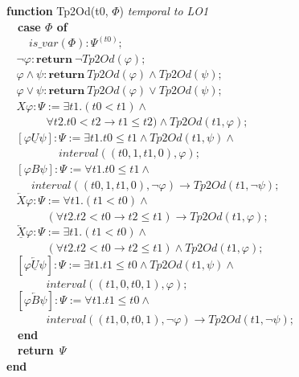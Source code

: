 \documentclass{article}
\begin{document}
\begin{multicols}{4}
\textbf{function} Tp2Od(t0, $\Phi$) \/\/\textit{temporal to LO1} \\
\ \ \textbf{case $\Phi$ of} \\
\ \ \ \ $is\_var(\Phi): \Psi^{(t0)};$ \\
$\ \ \ \ \neg \varphi : \textbf{return}\ \neg Tp2Od(\varphi); $ \\
$\ \ \ \ \varphi \wedge \psi : \textbf{return}\ Tp2Od(\varphi) \wedge Tp2Od(\psi); $ \\
$\ \ \ \ \varphi \vee \psi : \textbf{return}\ Tp2Od(\varphi) \vee Tp2Od(\psi); $ \\
$\ \ \ \ X\varphi : \Psi := \exists t1.(t0 < t1)\wedge$\\
$\ \ \ \ \ \ \ \ \ \ \ \ \ \ \ \ \forall t2.t0 < t2 \rightarrow t1 \leq t2) \wedge Tp2Od(t1, \varphi);$ \\
$\ \ \ \ [\varphi \underline{U} \psi] : \Psi := \exists t1.t0 \leq t1 \wedge Tp2Od(t1, \psi)\wedge$ \\
$\ \ \ \ \ \ \ \ \ \ \ \ \ \ \ \ \ \ \ \ \ interval((t0, 1, t1, 0), \varphi);$\\
$\ \ \ \ [\varphi B \psi] : \Psi := \forall t1.t0 \leq t1 \wedge $ \\
$\ \ \ \ \ \ \ \ \ \ interval((t0, 1, t1, 0), \neg\varphi) \rightarrow Tp2Od(t1, \neg\psi);$\\
$\ \ \ \ \overleftarrow{X}\varphi : \Psi := \forall t1.(t1 < t0)\wedge$ \\
$\ \ \ \ \ \ \ \ \ \ \ \ \ \ \ \ (\forall t2.t2 < t0 \rightarrow t2 \leq t1) \rightarrow Tp2Od(t1, \varphi);$ \\
$\ \ \ \ \overleftarrow{\underline{X}}\varphi : \Psi := \exists t1.(t1 < t0)\wedge$ \\
$\ \ \ \ \ \ \ \ \ \ \ \ \ \ \ \ (\forall t2.t2 < t0 \rightarrow t2 \leq t1) \wedge Tp2Od(t1, \varphi);$ \\
$\ \ \ \ [\varphi \overleftarrow{\underline{U}} \psi] : \Psi := \exists t1.t1 \leq t0 \wedge Tp2Od(t1, \psi)\wedge$ \\
$\ \ \ \ \ \ \ \ \ \ \ \ \ \ \ \ interval((t1, 0, t0, 1), \varphi);$\\
$\ \ \ \ [\varphi \overleftarrow{B} \psi] : \Psi := \forall t1.t1 \leq t0 \wedge$ \\
$\ \ \ \ \ \ \ \ \ \ \ \ \ \ \ \ interval((t1, 0, t0, 1), \neg\varphi) \rightarrow Tp2Od(t1, \neg\psi);$\\
\ \ \textbf{end} \\
\ \ \textbf{return}\ $\Psi$ \\
\textbf{end} \\


\end{multicols}
\end{document}
